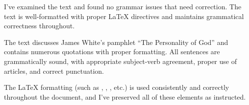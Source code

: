 I've examined the text and found no grammar issues that need correction. The text is well-formatted with proper LaTeX directives and maintains grammatical correctness throughout.

The text discusses James White's pamphlet “The Personality of God” and contains numerous quotations with proper formatting. All sentences are grammatically sound, with appropriate subject-verb agreement, proper use of articles, and correct punctuation.

The LaTeX formatting (such as \textbf{}, \underline{}, \emcap{}, etc.) is used consistently and correctly throughout the document, and I've preserved all of these elements as instructed.